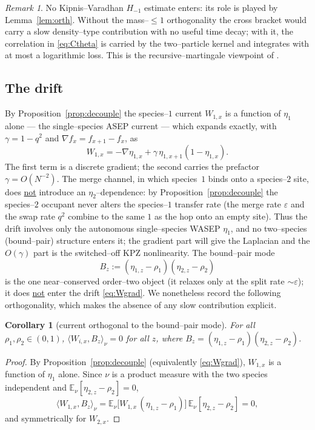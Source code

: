 \documentclass[11pt]{article}
\theoremstyle{plain}
\newtheorem{corollary}[theorem]{Corollary}
\theoremstyle{definition}
\theoremstyle{remark}
\newtheorem{remark}[theorem]{Remark}
\newcommand{\E}{\mathbb{E}}\newcommand{\PP}{\mathbb{P}}\newcommand{\dd}{\,\mathrm{d}}
\newcommand{\ip}[2]{\langle #1,#2\rangle_\nu}\newcommand{\bone}{\mathbf 1}
\newcommand{\eps}{\varepsilon}\newcommand{\Exp}{\mathrm{Exp}}
\begin{document}
\begin{remark}\label{rem:noH}
No Kipnis--Varadhan $H_{-1}$ estimate enters: its role is played by
Lemma~\ref{lem:orth}. Without the mass--$\le1$ orthogonality the cross bracket would
carry a slow density--type contribution with no useful time decay; with it, the
correlation in \eqref{eq:Ctheta} is carried by the two--particle kernel and
integrates with at most a logarithmic loss. This is the recursive--martingale
viewpoint of \cite{ACR2}.
\end{remark}

\subsection{The drift}
By Proposition~\ref{prop:decouple} the species--$1$ current $W_{1,x}$ is a function of
$\eta_1$ alone --- the single--species ASEP current --- which expands exactly, with
$\gamma=1-q^2$ and $\nabla f_x=f_{x+1}-f_x$, as
\begin{equation}\label{eq:Wgrad}
  W_{1,x}=-\nabla\eta_{1,x}+\gamma\,\eta_{1,x+1}(1-\eta_{1,x}).
\end{equation}
The first term is a discrete gradient; the second carries the prefactor
$\gamma=O(N^{-2})$. The merge channel, in which species~$1$ binds onto a species--$2$
site, does \underline{not} introduce an $\eta_2$--dependence: by
Proposition~\ref{prop:decouple} the species--$2$ occupant never alters the species--$1$
transfer rate (the merge rate $\eps$ and the swap rate $q^2$ combine to the same $1$ as
the hop onto an empty site). Thus the drift involves only the autonomous single--species
WASEP $\eta_1$, and no two--species (bound--pair) structure enters it; the gradient part
will give the Laplacian and the $O(\gamma)$ part is the switched--off KPZ nonlinearity.
The bound--pair mode
\begin{equation}\label{eq:Bdef}
  B_z:=(\eta_{1,z}-\rho_1)(\eta_{2,z}-\rho_2)
\end{equation}
is the one near--conserved order--two object (it relaxes only at the split rate
$\sim\eps$); it does \underline{not} enter the drift \eqref{eq:Wgrad}. We nonetheless record
the following orthogonality, which makes the absence of any slow contribution explicit.

\begin{corollary}[current orthogonal to the bound--pair mode]\label{prop:sym}
For all $\rho_1,\rho_2\in(0,1)$, $\ip{W_{i,x}}{B_z}=0$ for all $z$, where
$B_z=(\eta_{1,z}-\rho_1)(\eta_{2,z}-\rho_2)$.
\end{corollary}
\begin{proof}
By Proposition~\ref{prop:decouple} (equivalently \eqref{eq:Wgrad}), $W_{1,x}$ is a
function of $\eta_1$ alone. Since $\nu$ is a product measure with the two species
independent and $\E_\nu[\eta_{2,z}-\rho_2]=0$,
\[
  \ip{W_{1,x}}{B_z}=\E_\nu\big[W_{1,x}\,(\eta_{1,z}-\rho_1)\big]\,\E_\nu[\eta_{2,z}-\rho_2]=0,
\]
and symmetrically for $W_{2,x}$.
\end{proof}
\end{document}
